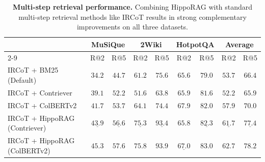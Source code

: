 \documentclass{article}
\begin{document}
\begin{table}[t]
\small
  \caption{\textbf{Multi-step retrieval performance.} Combining HippoRAG with standard multi-step retrieval methods like IRCoT results in strong complementary improvements on all three datasets.}
  \label{tab:multi_retrieve}
  \centering
\begin{tabular}{@{}lcccccc|cc@{}}
\toprule
             & \multicolumn{2}{c}{\textbf{MuSiQue}} & \multicolumn{2}{c}{\textbf{2Wiki}} & \multicolumn{2}{c}{\textbf{HotpotQA}} & \multicolumn{2}{c}{\textbf{Average}}  \\ \cmidrule(l){2-9} 
             & R@2   & R@5     & R@2      & R@5       & R@2    & R@5   & R@2  & R@5     \\ \midrule
IRCoT + BM25 (Default)      & $34.2$       &  $44.7$        & $61.2$                &  $75.6$     & $65.6$  & $79.0$ & $53.7$ & $66.4$ \\
IRCoT + Contriever &  $39.1$           &  $52.2$           &  $51.6$          &   $63.8$ & $65.9$            &   $81.6$ & $52.2$ & $65.9$       \\%
IRCoT + ColBERTv2 &   $41.7$           & $53.7$             &   $64.1$           & $74.4$         & $\mathbf{67.9}$            &   $82.0$ & $57.9$ & $70.0$          \\ \midrule
IRCoT + HippoRAG (Contriever) & $\underline{43.9}$ & $\underline{56.6}$ & $\underline{75.3}$ &  $\underline{93.4}$ & $65.8$ & $\underline{82.3}$ & $\underline{61.7}$ & $\underline{77.4}$ \\%
IRCoT + HippoRAG (ColBERTv2) & $\mathbf{45.3}$ & $\mathbf{57.6}$ & $\mathbf{75.8}$ & $\mathbf{93.9}$ & $\underline{67.0}$ & $\mathbf{83.0}$ & $\mathbf{62.7}$ & $\mathbf{78.2}$ \\ 
\bottomrule
\end{tabular}
\vspace{-5pt}
\end{table}
\end{document}
